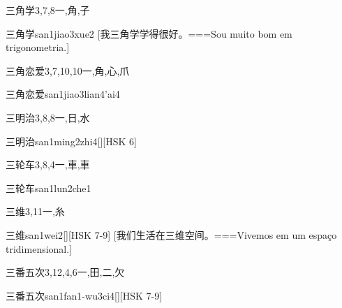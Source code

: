 \begin{Entry}{三角学}{3,7,8}{⼀,⾓,⼦}
  \begin{Phonetics}{三角学}{san1jiao3xue2}
    [我三角学学得很好。===Sou muito bom em trigonometria.]
  \end{Phonetics}
\end{Entry}

\begin{Entry}{三角恋爱}{3,7,10,10}{⼀,⾓,⼼,⽖}
  \begin{Phonetics}{三角恋爱}{san1jiao3lian4'ai4}
  \end{Phonetics}
\end{Entry}

\begin{Entry}{三明治}{3,8,8}{⼀,⽇,⽔}
  \begin{Phonetics}{三明治}{san1ming2zhi4}[][HSK 6]
  \end{Phonetics}
\end{Entry}

\begin{Entry}{三轮车}{3,8,4}{⼀,⾞,⾞}
  \begin{Phonetics}{三轮车}{san1lun2che1}
  \end{Phonetics}
\end{Entry}

\begin{Entry}{三维}{3,11}{⼀,⽷}
  \begin{Phonetics}{三维}{san1wei2}[][HSK 7-9]
    [我们生活在三维空间。===Vivemos em um espaço tridimensional.]
  \end{Phonetics}
\end{Entry}

\begin{Entry}{三番五次}{3,12,4,6}{⼀,⽥,⼆,⽋}
  \begin{Phonetics}{三番五次}{san1fan1-wu3ci4}[][HSK 7-9]
  \end{Phonetics}
\end{Entry}

